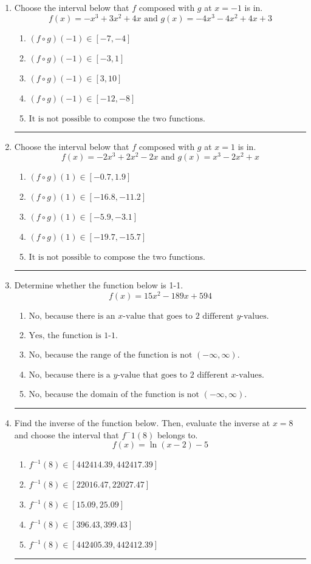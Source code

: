 \documentclass[14pt]{extbook}
\newcommand{\litem}[1]{\item#1\hspace*{-1cm}\rule{\textwidth}{0.4pt}}
\begin{document}
\begin{enumerate}
\litem{
Choose the interval below that $f$ composed with $g$ at $x=-1$ is in.\[ f(x) = -x^{3} +3 x^{2} +4 x \text{ and } g(x) = -4x^{3} -4 x^{2} +4 x + 3 \]\begin{enumerate}[label=\Alph*.]
\item \( (f \circ g)(-1) \in [-7, -4] \)
\item \( (f \circ g)(-1) \in [-3, 1] \)
\item \( (f \circ g)(-1) \in [3, 10] \)
\item \( (f \circ g)(-1) \in [-12, -8] \)
\item \( \text{It is not possible to compose the two functions.} \)

\end{enumerate} }
\litem{
Choose the interval below that $f$ composed with $g$ at $x=1$ is in.\[ f(x) = -2x^{3} +2 x^{2} -2 x \text{ and } g(x) = x^{3} -2 x^{2} +x \]\begin{enumerate}[label=\Alph*.]
\item \( (f \circ g)(1) \in [-0.7, 1.9] \)
\item \( (f \circ g)(1) \in [-16.8, -11.2] \)
\item \( (f \circ g)(1) \in [-5.9, -3.1] \)
\item \( (f \circ g)(1) \in [-19.7, -15.7] \)
\item \( \text{It is not possible to compose the two functions.} \)

\end{enumerate} }
\litem{
Determine whether the function below is 1-1.\[ f(x) = 15 x^2 - 189 x + 594 \]\begin{enumerate}[label=\Alph*.]
\item \( \text{No, because there is an $x$-value that goes to 2 different $y$-values.} \)
\item \( \text{Yes, the function is 1-1.} \)
\item \( \text{No, because the range of the function is not $(-\infty, \infty)$.} \)
\item \( \text{No, because there is a $y$-value that goes to 2 different $x$-values.} \)
\item \( \text{No, because the domain of the function is not $(-\infty, \infty)$.} \)

\end{enumerate} }
\litem{
Find the inverse of the function below. Then, evaluate the inverse at $x = 8$ and choose the interval that $f^-1(8)$ belongs to.\[ f(x) = \ln{(x-2)}-5 \]\begin{enumerate}[label=\Alph*.]
\item \( f^{-1}(8) \in [442414.39, 442417.39] \)
\item \( f^{-1}(8) \in [22016.47, 22027.47] \)
\item \( f^{-1}(8) \in [15.09, 25.09] \)
\item \( f^{-1}(8) \in [396.43, 399.43] \)
\item \( f^{-1}(8) \in [442405.39, 442412.39] \)


\end{enumerate}}
\end{enumerate}
\end{document}
